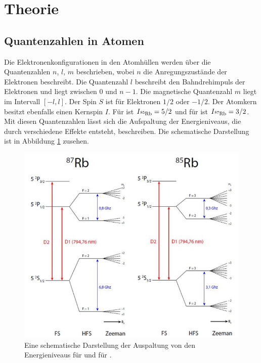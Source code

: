 \section{Theorie}
\label{sec:Theorie}

\subsection{Quantenzahlen in Atomen}
\noindent Die Elektronenkonfigurationen in den Atomhüllen werden über die Quantenzahlen
$n$, $l$, $m$ beschrieben,
wobei $n$ die Anregungszustände der Elektronen beschreibt.
Die Quantenzahl $l$ beschreibt den Bahndrehimpuls der Elektronen 
und liegt zwischen $0$ und $n-1$. 
Die magnetische Quantenzahl $m$ liegt im Intervall $\left[-l,l \right]$.
Der Spin $S$ ist für Elektronen $1 / 2$ oder $- 1 / 2$.
Der Atomkern besitzt ebenfalls einen Kernspin $I$.
Für  ist $I_{\ce{^{85}Rb}}=5 / 2$
und für  ist  $I_{\ce{^{87}Rb}}=3 / 2$.
\newline \newline
\noindent Mit diesen Quantenzahlen lässt sich die Aufspaltung der Energieniveaus,
die durch verschiedene Effekte entsteht, beschreiben.
Die schematische Darstellung ist in Abbildung \ref{fig:Energieniveaus} zusehen.

\begin{figure}
    \centering
    \includegraphics[width=\textwidth]{Fotos/energieniveaus.png}
    \caption{Eine schematische Darstellung der Auspaltung von den Energieniveaus für 
     und für  \cite{energieniveaus}.}
    \label{fig:Energieniveaus}
\end{figure}

